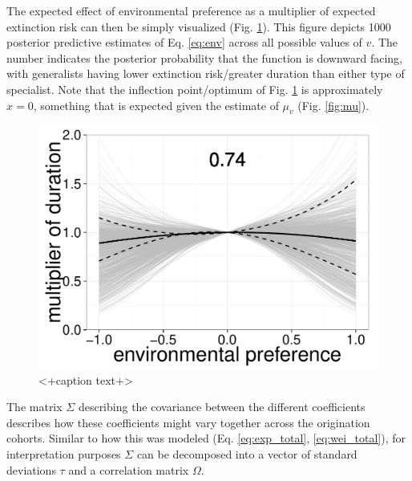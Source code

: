 \documentclass[12pt,letterpaper]{article}
\begin{document}
The expected effect of environmental preference as a multiplier of expected extinction risk can then be simply visualized (Fig. \ref{fig:env_mean}). This figure depicts 1000 posterior predictive estimates of Eq. \ref{eq:env} across all possible values of \(v\). The number indicates the posterior probability that the function is downward facing, with generalists having lower extinction risk/greater duration than either type of specialist. Note that the inflection point/optimum of Fig. \ref{fig:env_mean} is approximately \(x = 0\), something that is expected given the estimate of \(\mu_{v}\) (Fig. \ref{fig:mu}).
\begin{figure}[ht]
  \centering
  \includegraphics[height = 0.5\textheight,width=\textwidth,keepaspectratio=true]{figure/environ_quad}
  \caption{<+caption text+>}
  \label{fig:env_mean}
\end{figure}

The matrix \(\Sigma\) describing the covariance between the different coefficients describes how these coefficients might vary together across the origination cohorts. Similar to how this was modeled (Eq. \ref{eq:exp_total}, \ref{eq:wei_total}), for interpretation purposes \(\Sigma\) can be decomposed into a vector of standard deviations \(\tau\) and a correlation matrix \(\Omega\).
\end{document}
